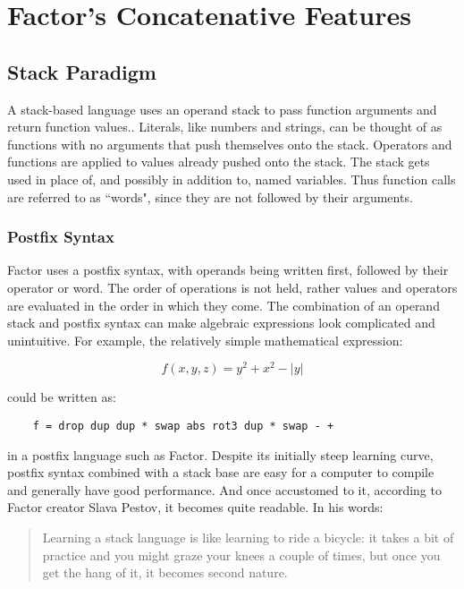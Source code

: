 \documentclass{sig-alternate}
\begin{document}
\section{Factor's Concatenative Features} 

\subsection{Stack Paradigm}
A stack-based language uses an operand stack to pass function arguments and return function values.\cite{FactorArticle}. Literals, like numbers and strings, can be thought of as functions with no arguments that push themselves onto the stack. Operators and functions are applied to values already pushed onto the stack. The stack gets used in place of, and possibly in addition to, named variables. Thus function calls are referred to as ``words", since they are not followed by their arguments.

\subsubsection{Postfix Syntax}
Factor uses a postfix syntax, with operands being written first, followed by their operator or word. The order of operations is not held, rather values and operators are evaluated in the order in which they come. The combination of an operand stack and postfix syntax can make algebraic expressions look complicated and unintuitive.\cite{Concatenative} For example, the relatively simple mathematical expression: 
	
\begin{equation}
	f(x, y, z) = y^{2} + x^{2} - |y|
\end{equation}

could be written as: 

\begin{verbatim}
	f = drop dup dup * swap abs rot3 dup * swap - +
\end{verbatim}

\cite{Concatenative} in a postfix language such as Factor. Despite its initially steep learning curve, postfix syntax combined with a stack base are easy for a computer to compile and generally have good performance. And once accustomed to it, according to Factor creator Slava Pestov, it becomes quite readable. In his words: 
\begin{quotation}
Learning a stack language is like learning to ride a bicycle: it takes a bit of practice and you might graze your knees a couple of times, but once you get the hang of it, it becomes second nature.\cite{FactorPhilosophy}
\end{quotation}
\end{document}
